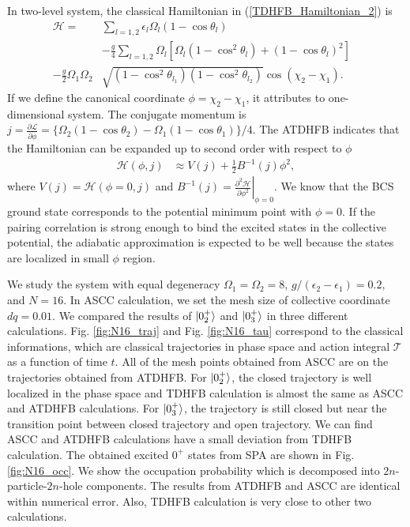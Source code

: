 \documentclass[%
superscriptaddress,
showpacs,
nofootinbib,
amsmath,amssymb,
aps,
prc,
twocolumn,
floatfix ]%
{revtex4-1}
\begin{document}
In two-level system, the classical Hamiltonian in (\ref{TDHFB_Hamiltonian_2}) is
\begin{align}
\mathcal{H} 
  =& \sum_{l=1,2} \epsilon_l\Omega_l(1- \cos{\theta}_l)& \nonumber \\ 
 &- \frac{g}{4}\sum_{l=1,2} \Omega_l [\Omega_l(1-\cos^2{\theta}_l)+(1-\cos{\theta}_l)^2] \nonumber \\
- \frac{g}{2} \Omega_{1}\Omega_{2}&\sqrt{(1-\cos^2{\theta}_{l_1})(1-\cos^2{\theta}_{l_2})}\cos{(\chi_{2}-\chi_{1})}   .
\end{align}
If we define the canonical coordinate $\phi=\chi_2-\chi_1$, it attributes to one-dimensional system. The conjugate momentum is $j= \frac{\partial\mathcal{L}}{\partial\dot{\phi}} = \{\Omega_2(1-\cos{\theta}_2) - \Omega_1(1-\cos{\theta}_1)\}/4$. The ATDHFB indicates that the Hamiltonian can be expanded up to second order with respect to $\phi$
\begin{align}
  \mathcal{H}(\phi,j) &\approx V(j) + \frac{1}{2}B^{-1}(j)\phi^2,
\end{align}
where $V(j)=\mathcal{H}(\phi=0,j)$ and $B^{-1}(j)= \left. \frac{\partial^2\mathcal{H}}{\partial\phi^2} \right|_{\phi=0}$.
We know that the BCS ground state corresponds to the potential minimum point with $\phi=0$. If the pairing correlation is strong enough to bind the excited states in the collective potential,  the adiabatic approximation is expected to be well because the states are localized in small $\phi$ region. 

We study the system with equal degeneracy $\Omega_1=\Omega_2=8$, $g/(\epsilon_2-\epsilon_1)=0.2$, and $N=16$. In ASCC calculation, we set the mesh size of collective coordinate $dq=0.01$. We compared the results of $\ket{0_2^+}$ and $\ket{0_3^+}$ in three different calculations. Fig. \ref{fig:N16_traj} and Fig. \ref{fig:N16_tau} correspond to the classical informations, which are classical trajectories in phase space and action integral $\mathcal{T}$ as a function of time $t$. All of the mesh points obtained from ASCC are on the trajectories obtained from ATDHFB. For $\ket{0_2^+}$, the closed trajectory is well localized in the phase space and TDHFB calculation is almost the same as ASCC and ATDHFB calculations. For $\ket{0_3^+}$, the trajectory is still closed but near the transition point between closed trajectory and open trajectory. We can find ASCC and ATDHFB calculations have a small deviation from TDHFB calculation. The obtained excited $0^+$ states from SPA are shown in Fig. \ref{fig:N16_occ}. We show the occupation probability which is decomposed into $2n$-particle-$2n$-hole components. The results from ATDHFB and ASCC are identical within numerical error. Also, TDHFB calculation is very close to other two calculations. 
\end{document}
